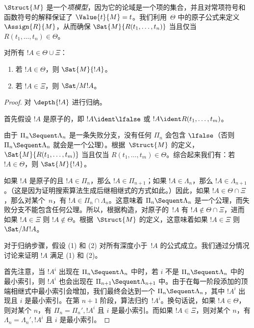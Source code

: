 \documentclass[../../../include/open-logic-section]{subfiles}
\begin{document}
$\Struct{M}$ 是一个\emph{项模型}，因为它的论域是一个项的集合，并且对常项符号和函数符号的解释保证了 $\Value{t}{M} = t$。我们利用~$\Theta$ 中的原子公式来定义 $\Assign{R}{M}$，从而确保 $\Sat{M}{R(t_1, \dots, t_n)}$ 当且仅当 $R(t_1, \dots, t_n)
\in \Theta$。

\begin{lem}
对所有 $!A \in \Theta \cup \Xi$：
\begin{enumerate}
  \item 若 $!A \in \Theta$，则 $\Sat{M}{!A}$。
  \item 若 $!A \in \Xi$，则 $\Sat/{M}{!A}$。
\end{enumerate}
\end{lem}

\begin{proof}
  对 $\depth{!A}$ 进行归纳。

首先假设 $!A$ 是原子的，即 $!A \ident \lfalse$ 或 $!A
\ident R(t_1, \dots, t_m)$。

由于 $\Pi_n \Sequent \Lambda_n$ 是一条失败分支，没有任何 $\Pi_n$ 会包含 $\lfalse$（否则 $\Pi_n \Sequent \Lambda_n$ 就会是一个公理）。根据~$\Struct{M}$ 的定义，$\Sat{M}{R(t_1, \dots, t_m)}$ 当且仅当 $R(t_1, \dots, t_m) \in
\Theta$。综合起来我们有：若 $!A \in \Theta$，则 $\Sat{M}{!A}$。

如果 $!A$ 是原子的且 $!A \in \Pi_n$，那么 $!A \in \Pi_{n+1}$；如果 $!A \in \Lambda_n$，那么 $!A \in \Lambda_{n+1}$。（这是因为证明搜索算法生成后继相继式的方式如此。）因此，如果 $!A \in \Theta \cap \Xi$，那么对某个~$n$，有 $!A \in \Pi_n \cap \Lambda_n$。这意味着 $\Pi_n \Sequent \Lambda_n$ 是一个公理，而失败分支不能包含任何公理。所以，根据构造，对原子的~$!A$ 有 $!A \notin \Theta \cap \Xi$，进而如果 $!A \in \Xi$ 则 $!A \notin \Theta$。根据~$\Struct{M}$ 的定义，这意味着如果 $!A \in \Xi$ 则 $\Sat/{M}{!A}$。

对于归纳步骤，假设 (1) 和 (2) 对所有深度小于~$!A$ 的公式成立。我们通过分情况讨论来证明 $!A$ 满足 (1) 和 (2)。

首先注意，当 $!A^i$ 出现在 $\Pi_n \Sequent \Lambda_n$ 中时，若 $i$ 不是 $\Pi_n \Sequent \Lambda_n$ 中的最小索引，则 $!A^i$ 也会出现在 $\Pi_{n+1} \Sequent \Lambda_{n+1}$ 中。由于在每一阶段添加的顶端相继式中最小索引会增加，我们最终会达到一个 $\Pi_n \Sequent \Lambda_n$，其中 $!A^i$ 出现且 $i$ 是最小索引。在第 $n+1$ 阶段，算法归约~$!A^i$。换句话说，如果 $!A \in \Theta$，则对某个 $n$，有 $\Pi_n = \Pi_n',
!A^i$ 且 $i$ 是最小索引。而如果 $!A \in \Xi$，则对某个 $n$，有 $\Lambda_n = \Lambda_n', !A^i$ 且 $i$ 是最小索引。


\end{proof}
\end{document}
